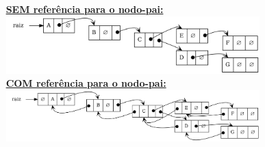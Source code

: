 \documentclass[aspectratio=169]{beamer}
\begin{document}
\begin{frame}
\begin{columns}[T]
\begin{column}{0.2\linewidth}
\begin{figure}[h]
\end{figure}
\end{column}
\begin{column}{0.8\linewidth}
\vspace{-2mm}
\begin{figure}[h]
	\centering
	\textbf{\underline{SEM referência para o nodo-pai:}}\\	
	\includegraphics[height=0.3\paperheight]{imagens/arvore_binaria03-enc1.png}\\
	\textbf{\underline{COM referência para o nodo-pai:}}\\	
	\includegraphics[height=0.27\paperheight]{imagens/arvore_binaria03-enc2.png}
\end{figure}
\end{column}
\end{columns}
\end{frame}
\end{document}
